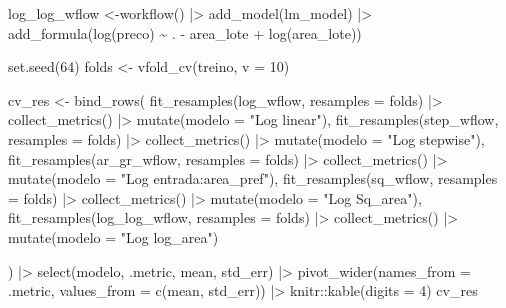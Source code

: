 \documentclass[
  letterpaper,
  DIV=11,
  numbers=noendperiod]{scrartcl}
\newenvironment{Shaded}{\begin{snugshade}}{\end{snugshade}}
\newcommand{\AttributeTok}[1]{\textcolor[rgb]{0.40,0.45,0.13}{#1}}
\newcommand{\DecValTok}[1]{\textcolor[rgb]{0.68,0.00,0.00}{#1}}
\newcommand{\FunctionTok}[1]{\textcolor[rgb]{0.28,0.35,0.67}{#1}}
\newcommand{\NormalTok}[1]{\textcolor[rgb]{0.00,0.23,0.31}{#1}}
\newcommand{\OtherTok}[1]{\textcolor[rgb]{0.00,0.23,0.31}{#1}}
\newcommand{\SpecialCharTok}[1]{\textcolor[rgb]{0.37,0.37,0.37}{#1}}
\newcommand{\StringTok}[1]{\textcolor[rgb]{0.13,0.47,0.30}{#1}}
\begin{document}
\begin{Shaded}
\begin{Highlighting}[]
\NormalTok{log\_log\_wflow }\OtherTok{\textless{}{-}}\FunctionTok{workflow}\NormalTok{() }\SpecialCharTok{|\textgreater{}}
  \FunctionTok{add\_model}\NormalTok{(lm\_model) }\SpecialCharTok{|\textgreater{}}
  \FunctionTok{add\_formula}\NormalTok{(}\FunctionTok{log}\NormalTok{(preco) }\SpecialCharTok{\textasciitilde{}}\NormalTok{ . }\SpecialCharTok{{-}}\NormalTok{ area\_lote }\SpecialCharTok{+} \FunctionTok{log}\NormalTok{(area\_lote))}

\FunctionTok{set.seed}\NormalTok{(}\DecValTok{64}\NormalTok{)}
\NormalTok{folds }\OtherTok{\textless{}{-}} \FunctionTok{vfold\_cv}\NormalTok{(treino, }\AttributeTok{v =} \DecValTok{10}\NormalTok{)}

\NormalTok{cv\_res }\OtherTok{\textless{}{-}} \FunctionTok{bind\_rows}\NormalTok{(}
  \FunctionTok{fit\_resamples}\NormalTok{(log\_wflow,    }\AttributeTok{resamples =}\NormalTok{ folds) }\SpecialCharTok{|\textgreater{}} \FunctionTok{collect\_metrics}\NormalTok{() }\SpecialCharTok{|\textgreater{}} \FunctionTok{mutate}\NormalTok{(}\AttributeTok{modelo =} \StringTok{"Log linear"}\NormalTok{),}
  \FunctionTok{fit\_resamples}\NormalTok{(step\_wflow,   }\AttributeTok{resamples =}\NormalTok{ folds) }\SpecialCharTok{|\textgreater{}} \FunctionTok{collect\_metrics}\NormalTok{() }\SpecialCharTok{|\textgreater{}} \FunctionTok{mutate}\NormalTok{(}\AttributeTok{modelo =} \StringTok{"Log stepwise"}\NormalTok{),}
  \FunctionTok{fit\_resamples}\NormalTok{(ar\_gr\_wflow,  }\AttributeTok{resamples =}\NormalTok{ folds) }\SpecialCharTok{|\textgreater{}} \FunctionTok{collect\_metrics}\NormalTok{() }\SpecialCharTok{|\textgreater{}} \FunctionTok{mutate}\NormalTok{(}\AttributeTok{modelo =} \StringTok{"Log entrada:area\_pref"}\NormalTok{),}
  \FunctionTok{fit\_resamples}\NormalTok{(sq\_wflow,     }\AttributeTok{resamples =}\NormalTok{ folds) }\SpecialCharTok{|\textgreater{}} \FunctionTok{collect\_metrics}\NormalTok{() }\SpecialCharTok{|\textgreater{}} \FunctionTok{mutate}\NormalTok{(}\AttributeTok{modelo =} \StringTok{"Log Sq\_area"}\NormalTok{),}
  \FunctionTok{fit\_resamples}\NormalTok{(log\_log\_wflow,   }\AttributeTok{resamples =}\NormalTok{ folds) }\SpecialCharTok{|\textgreater{}} \FunctionTok{collect\_metrics}\NormalTok{() }\SpecialCharTok{|\textgreater{}} \FunctionTok{mutate}\NormalTok{(}\AttributeTok{modelo =} \StringTok{"Log log\_area"}\NormalTok{)}
  
\NormalTok{) }\SpecialCharTok{|\textgreater{}}
  \FunctionTok{select}\NormalTok{(modelo, .metric, mean, std\_err) }\SpecialCharTok{|\textgreater{}}
  \FunctionTok{pivot\_wider}\NormalTok{(}\AttributeTok{names\_from =}\NormalTok{ .metric, }\AttributeTok{values\_from =} \FunctionTok{c}\NormalTok{(mean, std\_err)) }\SpecialCharTok{|\textgreater{}}
\NormalTok{  knitr}\SpecialCharTok{::}\FunctionTok{kable}\NormalTok{(}\AttributeTok{digits =} \DecValTok{4}\NormalTok{)}
\NormalTok{cv\_res}
\end{Highlighting}
\end{Shaded}
\end{document}
